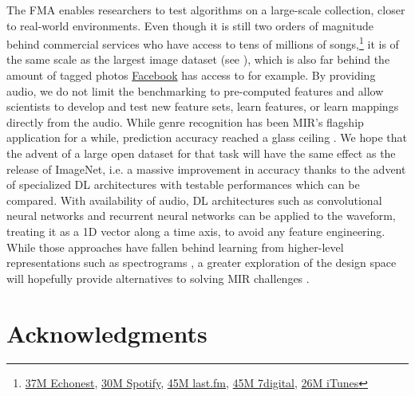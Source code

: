 \documentclass{article}
\begin{document}

The FMA enables researchers to test algorithms on a large-scale collection, closer to real-world environments. Even though it is still two orders of magnitude behind commercial services who have access to tens of millions of songs,\footnote{\href{http://the.echonest.com}{37M Echonest}, \href{https://en.wikipedia.org/wiki/Spotify}{30M Spotify}, \href{http://www.skilledtests.com/wiki/Last.fm_statistics}{45M last.fm}, \href{http://bupz.com/best-websites-to-buy-musics}{45M 7digital}, \href{https://www.apple.com/pr/library/2013/02/06iTunes-Store-Sets-New-Record-with-25-Billion-Songs-Sold.html}{26M iTunes}} it is of the same scale as the largest image dataset (see ), which is also far behind the amount of tagged photos \href{https://www.facebook.com}{Facebook} has access to for example.
By providing audio, we do not limit the benchmarking to pre-computed features and allow scientists to develop and test new feature sets, learn features, or learn mappings directly from the audio.
While genre recognition has been MIR's flagship application for a while, prediction accuracy reached a glass ceiling \cite{mgr_why}. We hope that the advent of a large open dataset for that task will have the same effect as the release of ImageNet, i.e. a massive improvement in accuracy thanks to the advent of specialized DL architectures with testable performances which can be compared.
With availability of audio, DL architectures such as convolutional neural networks and recurrent neural networks can be applied to the waveform, treating it as a 1D vector along a time axis, to avoid any feature engineering.
While those approaches have fallen behind learning from higher-level representations such as spectrograms \cite{dieleman_endtoend}, a greater exploration of the design space will hopefully provide alternatives to solving MIR challenges \cite{mir_dl_feature_learning}.



\section{Acknowledgments}
\end{document}
